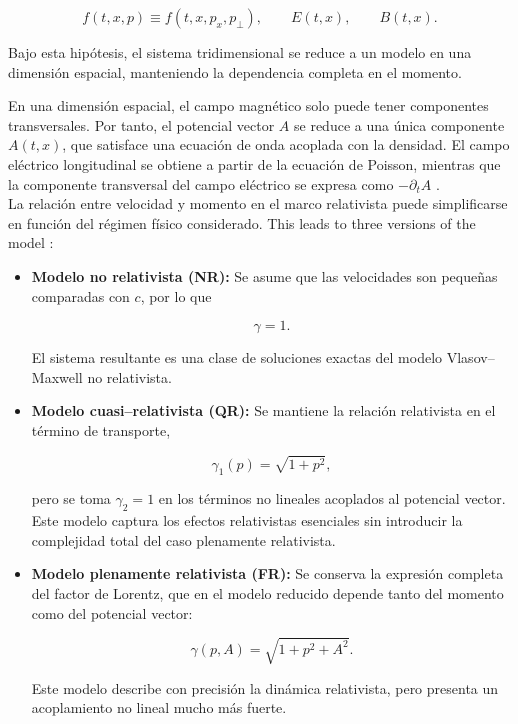 \documentclass[11pt,a4paper,twoside,pdf]{article}
\numberwithin{equation}{section}
\begin{document}
\[
f(t,x,p) \equiv f(t,x,p_x,p_\perp), \qquad
E(t,x), \qquad B(t,x).
\]


Bajo esta hipótesis, el sistema tridimensional se reduce a un modelo en una dimensión
espacial, manteniendo la dependencia completa en el momento.



En una dimensión espacial, el campo magnético solo puede tener componentes
transversales. Por tanto, el potencial vector $A$ se reduce a una única componente
$A(t,x)$, que satisface una ecuación de onda acoplada con la densidad.
El campo eléctrico longitudinal se obtiene a partir de la ecuación de Poisson, mientras
que la componente transversal del campo eléctrico se expresa como $-\partial_t A$ \cite{martin2021campo}.\\


La relación entre velocidad y momento en el marco relativista puede simplificarse en función del régimen físico
considerado. This leads to three versions of the model \cite{janssen2022gravitacion}:

\begin{itemize}
\item \textbf{Modelo no relativista (NR):}  
Se asume que las velocidades son pequeñas comparadas con $c$, por lo que  


\[
\gamma = 1.
\]


El sistema resultante es una clase de soluciones exactas del modelo
Vlasov–Maxwell no relativista.

\item \textbf{Modelo cuasi–relativista (QR):}  
Se mantiene la relación relativista en el término de transporte,


\[
\gamma_1(p)=\sqrt{1+p^2},
\]


pero se toma $\gamma_2=1$ en los términos no lineales acoplados al potencial
vector. Este modelo captura los efectos relativistas esenciales sin introducir la
complejidad total del caso plenamente relativista.

\item \textbf{Modelo plenamente relativista (FR):}  
Se conserva la expresión completa del factor de Lorentz, que en el modelo
reducido depende tanto del momento como del potencial vector:


\[
\gamma(p,A)=\sqrt{1+p^2 + A^2}.
\]


Este modelo describe con precisión la dinámica relativista, pero presenta un
acoplamiento no lineal mucho más fuerte.
\end{itemize}
\end{document}
